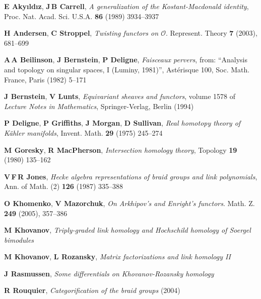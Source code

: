 \documentclass[12pt]{wart}
\theoremstyle{remark}
\begin{document}
\def\cprime{$'$}
\begin{thebibliography}[DGMS]{}
\providecommand\bibmarginpar{\leavevmode\marginpar}
\def\urlstyle#1{{\tt #1}}

\textbf{E Aky{\i}ld{\i}z}, \textbf{J\,B Carrell}, \emph{A generalization of the
  {K}ostant-{M}acdonald identity}, Proc. Nat. Acad. Sci. U.S.A.  \textbf{86} (1989)
  3934--3937

\textbf{H Andersen}, \textbf{C Stroppel}, \emph{Twisting functors on $\mathcal{O}$}.  Represent. Theory   \textbf{7}  (2003), 681--699

\textbf{A\,A Beilinson}, \textbf{J Bernstein}, \textbf{P Deligne},
  \emph{Faisceaux pervers}, from: ``Analysis and topology on singular spaces, I
  (Luminy, 1981)'', Ast\'erisque 100, Soc. Math. France, Paris (1982)  5--171

\textbf{J Bernstein}, \textbf{V Lunts}, \emph{Equivariant sheaves and
  functors}, volume 1578 of \emph{Lecture Notes in Mathematics},
  Springer-Verlag, Berlin (1994)

\textbf{P Deligne}, \textbf{P Griffiths}, \textbf{J Morgan}, \textbf{D
  Sullivan}, \emph{Real homotopy theory of {K}\"ahler manifolds}, Invent. Math.
   \textbf{29} (1975) 245--274

\textbf{M Goresky}, \textbf{R MacPherson}, \emph{Intersection homology theory},
  Topology  \textbf{19} (1980) 135--162

\textbf{V\,F\,R Jones}, \emph{Hecke algebra representations of braid groups and
  link polynomials}, Ann. of Math. (2)  \textbf{126} (1987) 335--388

\textbf{O Khomenko}, \textbf{V Mazorchuk},
\emph{On Arkhipov's and Enright's functors}.
Math. Z.  \textbf{249} (2005), 357--386

\textbf{M Khovanov}, \emph{{Triply-graded link homology and Hochschild homology
  of Soergel bimodules}} 

\textbf{M Khovanov}, \textbf{L Rozansky}, \emph{{Matrix factorizations and link
  homology II}} 

\textbf{J Rasmussen}, \emph{{Some differentials on Khovanov-Rozansky homology}}

\textbf{R Rouquier}, \emph{{Categorification of the braid groups}} (2004)


\end{thebibliography}
\end{document}
